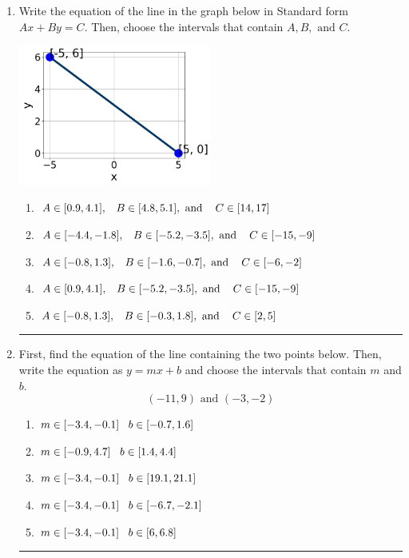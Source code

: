 \documentclass[14pt]{extbook}
\newcommand{\litem}[1]{\item#1\hspace*{-1cm}\rule{\textwidth}{0.4pt}}
\begin{document}
\begin{enumerate}
{\begin{enumerate}[label=\Alph*.]
\end{enumerate} }
\litem{
Write the equation of the line in the graph below in Standard form $Ax+By=C$. Then, choose the intervals that contain $A, B, \text{ and } C$.
\begin{center}
    \includegraphics[width=0.5\textwidth]{../Figures/linearGraphToStandardC.png}
\end{center}
\begin{enumerate}[label=\Alph*.]
\item \( A \in [0.9, 4.1], \hspace{3mm} B \in [4.8, 5.1], \text{ and } \hspace{3mm} C \in [14, 17] \)
\item \( A \in [-4.4, -1.8], \hspace{3mm} B \in [-5.2, -3.5], \text{ and } \hspace{3mm} C \in [-15, -9] \)
\item \( A \in [-0.8, 1.3], \hspace{3mm} B \in [-1.6, -0.7], \text{ and } \hspace{3mm} C \in [-6, -2] \)
\item \( A \in [0.9, 4.1], \hspace{3mm} B \in [-5.2, -3.5], \text{ and } \hspace{3mm} C \in [-15, -9] \)
\item \( A \in [-0.8, 1.3], \hspace{3mm} B \in [-0.3, 1.8], \text{ and } \hspace{3mm} C \in [2, 5] \)

\end{enumerate} }
\litem{
First, find the equation of the line containing the two points below. Then, write the equation as $ y=mx+b $ and choose the intervals that contain $m$ and $b$.\[ (-11, 9) \text{ and } (-3, -2) \]\begin{enumerate}[label=\Alph*.]
\item \( m \in [-3.4, -0.1] \hspace*{3mm} b \in [-0.7, 1.6] \)
\item \( m \in [-0.9, 4.7] \hspace*{3mm} b \in [1.4, 4.4] \)
\item \( m \in [-3.4, -0.1] \hspace*{3mm} b \in [19.1, 21.1] \)
\item \( m \in [-3.4, -0.1] \hspace*{3mm} b \in [-6.7, -2.1] \)
\item \( m \in [-3.4, -0.1] \hspace*{3mm} b \in [6, 6.8] \)


\end{enumerate}}
\end{enumerate}
\end{document}
